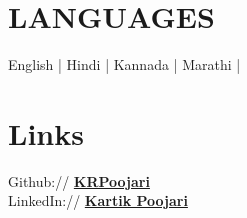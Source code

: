 \documentclass[]{resume}
\begin{document}
\begin{minipage}[t]{0.33\textwidth}

\section{LANGUAGES}
English | 
Hindi | 
Kannada |  
Marathi | 

\bigskip
\bigskip


\section{Links}
Github:// \href{https://github.com/KRPoojari}{\bf KRPoojari} \\
LinkedIn://  \href{https://www.linkedin.com/in/kartik-poojari-74250b201/}{\bf Kartik Poojari} \\

\sectionsep

\end{minipage}
\end{document}
